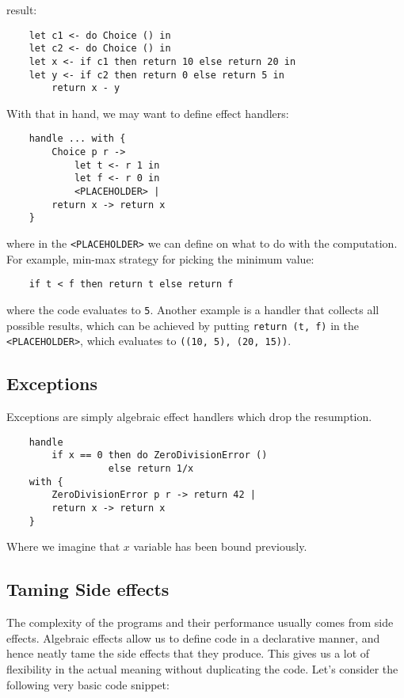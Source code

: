 \documentclass[declaration,shortabstract]{iithesis}
\theoremstyle{definition} \newtheorem{definition}{Definition}[chapter]
\theoremstyle{remark} \newtheorem{remark}[definition]{Observation}
\theoremstyle{plain} \newtheorem{theorem}[definition]{Theorem}
\theoremstyle{plain} \newtheorem{lemma}[definition]{Lemma}
\begin{document}
    result:

    \begin{verbatim}
    let c1 <- do Choice () in
    let c2 <- do Choice () in
    let x <- if c1 then return 10 else return 20 in
    let y <- if c2 then return 0 else return 5 in
        return x - y
    \end{verbatim}
    With that in hand, we may want to define effect handlers:

    \begin{verbatim}
    handle ... with {
        Choice p r ->
            let t <- r 1 in
            let f <- r 0 in
            <PLACEHOLDER> |
        return x -> return x
    }
    \end{verbatim}
    where in the \verb!<PLACEHOLDER>! we can define on what to do with the
    computation. For example, min-max strategy for picking the minimum value:

    \begin{verbatim}
    if t < f then return t else return f
    \end{verbatim}
    where the code evaluates to \verb!5!. Another example is a handler that
    collects all possible results, which can be achieved by putting
    \verb!return (t, f)! in the \verb!<PLACEHOLDER>!, which evaluates to
    \verb!((10, 5), (20, 15))!.

    \subsection{Exceptions}

    Exceptions are simply algebraic effect handlers which drop the resumption.

    \begin{verbatim}
    handle
        if x == 0 then do ZeroDivisionError ()
                  else return 1/x
    with {
        ZeroDivisionError p r -> return 42 |
        return x -> return x
    }
    \end{verbatim}
    Where we imagine that $x$ variable has been bound previously.

    \subsection{Taming Side effects}

    The complexity of the programs and their performance usually comes from side effects.
    Algebraic effects allow us to define code in a declarative manner, and hence
    neatly tame the side effects that they produce. This gives us a lot of flexibility
    in the actual meaning without duplicating the code. Let's consider the following
    very basic code snippet:
\end{document}
